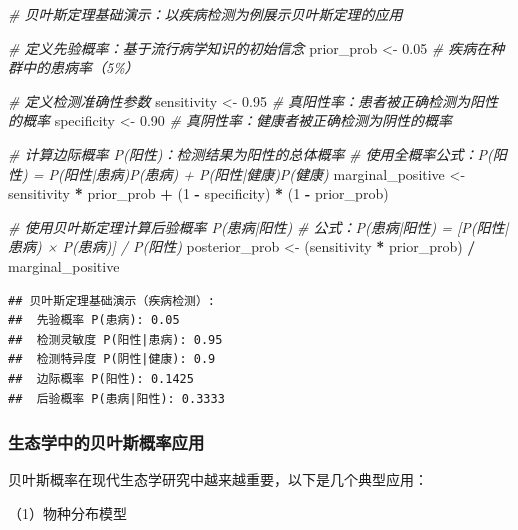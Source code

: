 \documentclass[
  twoside,12pt,fontset=none]{ctexbook}
\newenvironment{Shaded}{\begin{snugshade}}{\end{snugshade}}
\newcommand{\CommentTok}[1]{\textcolor[rgb]{0.56,0.35,0.01}{\textit{#1}}}
\newcommand{\DecValTok}[1]{\textcolor[rgb]{0.00,0.00,0.81}{#1}}
\newcommand{\FloatTok}[1]{\textcolor[rgb]{0.00,0.00,0.81}{#1}}
\newcommand{\NormalTok}[1]{#1}
\newcommand{\OtherTok}[1]{\textcolor[rgb]{0.56,0.35,0.01}{#1}}
\newcommand{\SpecialCharTok}[1]{\textcolor[rgb]{0.81,0.36,0.00}{\textbf{#1}}}
\begin{document}
\begin{Shaded}
\begin{Highlighting}[]
\CommentTok{\# 贝叶斯定理基础演示：以疾病检测为例展示贝叶斯定理的应用}

\CommentTok{\# 定义先验概率：基于流行病学知识的初始信念}
\NormalTok{prior\_prob }\OtherTok{\textless{}{-}} \FloatTok{0.05}  \CommentTok{\# 疾病在种群中的患病率（5\%）}

\CommentTok{\# 定义检测准确性参数}
\NormalTok{sensitivity }\OtherTok{\textless{}{-}} \FloatTok{0.95}  \CommentTok{\# 真阳性率：患者被正确检测为阳性的概率}
\NormalTok{specificity }\OtherTok{\textless{}{-}} \FloatTok{0.90}  \CommentTok{\# 真阴性率：健康者被正确检测为阴性的概率}

\CommentTok{\# 计算边际概率 P(阳性)：检测结果为阳性的总体概率}
\CommentTok{\# 使用全概率公式：P(阳性) = P(阳性|患病)P(患病) + P(阳性|健康)P(健康)}
\NormalTok{marginal\_positive }\OtherTok{\textless{}{-}}\NormalTok{  sensitivity }\SpecialCharTok{*}\NormalTok{ prior\_prob }\SpecialCharTok{+}
\NormalTok{   (}\DecValTok{1} \SpecialCharTok{{-}}\NormalTok{ specificity) }\SpecialCharTok{*}\NormalTok{ (}\DecValTok{1} \SpecialCharTok{{-}}\NormalTok{ prior\_prob)}

\CommentTok{\# 使用贝叶斯定理计算后验概率 P(患病|阳性)}
\CommentTok{\# 公式：P(患病|阳性) = [P(阳性|患病) × P(患病)] / P(阳性)}
\NormalTok{posterior\_prob }\OtherTok{\textless{}{-}}\NormalTok{ (sensitivity }\SpecialCharTok{*}\NormalTok{ prior\_prob) }\SpecialCharTok{/}\NormalTok{ marginal\_positive}
\end{Highlighting}
\end{Shaded}

\begin{verbatim}
## 贝叶斯定理基础演示（疾病检测）:
##  先验概率 P(患病): 0.05 
##  检测灵敏度 P(阳性|患病): 0.95 
##  检测特异度 P(阴性|健康): 0.9 
##  边际概率 P(阳性): 0.1425 
##  后验概率 P(患病|阳性): 0.3333
\end{verbatim}

\hypertarget{ux751fux6001ux5b66ux4e2dux7684ux8d1dux53f6ux65afux6982ux7387ux5e94ux7528}{%
\subsubsection{生态学中的贝叶斯概率应用}\label{ux751fux6001ux5b66ux4e2dux7684ux8d1dux53f6ux65afux6982ux7387ux5e94ux7528}}

贝叶斯概率在现代生态学研究中越来越重要，以下是几个典型应用：

（1）物种分布模型
\end{document}
